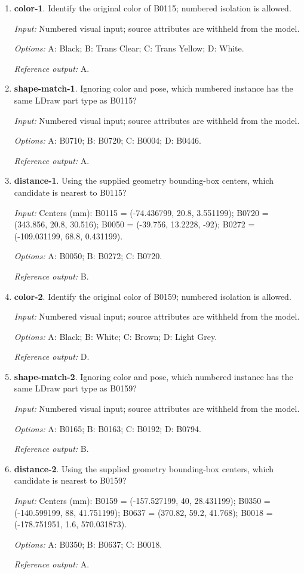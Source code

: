 \begin{enumerate}
\item \textbf{color-1}. Identify the original color of B0115; numbered isolation is allowed.\par {\small \textit{Input:} Numbered visual input; source attributes are withheld from the model. \par\textit{Options:} A: Black; B: Trans Clear; C: Trans Yellow; D: White. \par\textit{Reference output:} A.}
\item \textbf{shape-match-1}. Ignoring color and pose, which numbered instance has the same LDraw part type as B0115?\par {\small \textit{Input:} Numbered visual input; source attributes are withheld from the model. \par\textit{Options:} A: B0710; B: B0720; C: B0004; D: B0446. \par\textit{Reference output:} A.}
\item \textbf{distance-1}. Using the supplied geometry bounding-box centers, which candidate is nearest to B0115?\par {\small \textit{Input:} Centers (mm): B0115 = (-74.436799, 20.8, 3.551199); B0720 = (343.856, 20.8, 30.516); B0050 = (-39.756, 13.2228, -92); B0272 = (-109.031199, 68.8, 0.431199). \par\textit{Options:} A: B0050; B: B0272; C: B0720. \par\textit{Reference output:} B.}
\item \textbf{color-2}. Identify the original color of B0159; numbered isolation is allowed.\par {\small \textit{Input:} Numbered visual input; source attributes are withheld from the model. \par\textit{Options:} A: Black; B: White; C: Brown; D: Light Grey. \par\textit{Reference output:} D.}
\item \textbf{shape-match-2}. Ignoring color and pose, which numbered instance has the same LDraw part type as B0159?\par {\small \textit{Input:} Numbered visual input; source attributes are withheld from the model. \par\textit{Options:} A: B0165; B: B0163; C: B0192; D: B0794. \par\textit{Reference output:} B.}
\item \textbf{distance-2}. Using the supplied geometry bounding-box centers, which candidate is nearest to B0159?\par {\small \textit{Input:} Centers (mm): B0159 = (-157.527199, 40, 28.431199); B0350 = (-140.599199, 88, 41.751199); B0637 = (370.82, 59.2, 41.768); B0018 = (-178.751951, 1.6, 570.031873). \par\textit{Options:} A: B0350; B: B0637; C: B0018. \par\textit{Reference output:} A.}

\end{enumerate}
